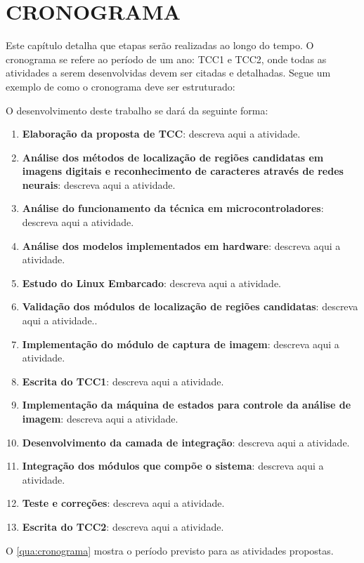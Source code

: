 
\chapter{CRONOGRAMA}
\label{chap:cronograma}

Este capítulo detalha que etapas serão realizadas ao longo do tempo. O cronograma se refere ao período de um ano: TCC1 e TCC2, onde todas as atividades a serem desenvolvidas devem ser citadas e detalhadas. Segue um exemplo de como o cronograma deve ser estruturado:

\noindent\hrulefill

O desenvolvimento deste trabalho se dará da seguinte forma:

\begin{enumerate}
	\item \label{ela-pro} \textbf{Elaboração da proposta de TCC}: descreva aqui a atividade.
	\item \label{anI} \textbf{Análise dos métodos de localização de regiões candidatas em imagens digitais e
		reconhecimento de caracteres através de redes neurais}: descreva aqui a atividade.
	\item \label{anII} \textbf{Análise do funcionamento da técnica em microcontroladores}: descreva aqui a atividade.
	\item \label{anIII} \textbf{Análise dos modelos implementados em hardware}: descreva aqui a atividade. 
	\item \label{dI} \textbf{Estudo do Linux Embarcado}: descreva aqui a atividade.
	\item \label{dII}  \textbf{Validação dos módulos de localização de regiões candidatas}: descreva aqui a atividade..
	\item \label{dIII} \textbf{Implementação do módulo de captura de imagem}: descreva aqui a atividade. 
	\item \label{esc-tcI}  \textbf{Escrita do TCC1}: descreva aqui a atividade.
	\item \label{imI} \textbf{Implementação da máquina de estados para controle da análise de imagem}: descreva aqui a atividade.
	\item \label{imII} \textbf{Desenvolvimento da camada de integração}: descreva aqui a atividade.
	\item \label{imIII} \textbf{Integração dos módulos que compõe o sistema}: descreva aqui a atividade.
	\item \label{tec} \textbf{Teste e correções}: descreva aqui a atividade.
	\item \label{esc-tcII} \textbf{Escrita do TCC2}: descreva aqui a atividade.
\end{enumerate}

O \autoref{qua:cronograma} mostra o período previsto para as atividades propostas.



